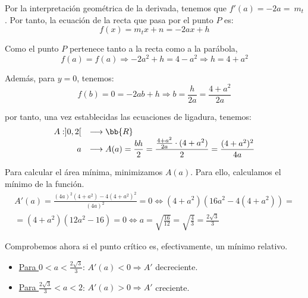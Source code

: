 \documentclass[12pt]{article}
\begin{document}
\begin{ejercicio}
\begin{enumerate}
\begin{figure}[H]
    \end{figure}

    Por la interpretación geométrica de la derivada, tenemos que $f'(a)=-2a=~m_t$. Por tanto, la ecuación de la recta que pasa por el punto $P$ es:
    \begin{equation*}
        f(x)=m_tx +n = -2ax+h
    \end{equation*}

    Como el punto $P$ pertenece tanto a la recta como a la parábola,
    \begin{equation*}
        f(a)=f(a)\Longrightarrow -2a^2+h = 4-a^2 \Longrightarrow h=4+a^2
    \end{equation*}

    Además, para $y=0$, tenemos:
    \begin{equation*}
        f(b)=0 = -2ab+h \Longrightarrow b=\frac{h}{2a} = \frac{4+a^2}{2a}
    \end{equation*}

    por tanto, una vez establecidas las ecuaciones de ligadura, tenemos:
    \begin{equation*}
        \begin{array}{rl}
            A:]0, 2[ & \longrightarrow \bb{R}\\
                    a & \longrightarrow A(a) = \displaystyle \frac{bh}{2} = \frac{\frac{4+a^2}{2a} \cdot (4+a^2)}{2} = \frac{(4+a^2)^2}{4a}
        \end{array}
    \end{equation*}

    Para calcular el área mínima, minimizamos $A(a)$. Para ello, calculamos el mínimo de la función.
    \begin{multline*}
        A'(a) = \frac{(4a)^2(4+a^2) -4(4+a^2)^2}{(4a)^2} = 0 \Longleftrightarrow
        (4+a^2)(16a^2-4(4+a^2)) =\\= (4+a^2)(12a^2-16) = 0 \Longleftrightarrow a=\sqrt{\frac{16}{12}}=\sqrt{\frac{4}{3}} = \frac{2\sqrt{3}}{3}
    \end{multline*}

    Comprobemos ahora si el punto crítico es, efectivamente, un mínimo relativo.
    \begin{itemize}
        \item \underline{Para $0<a<\frac{2\sqrt{3}}{3}$}: $A'(a)<0\Longrightarrow A'$ decreciente.
        \item \underline{Para $\frac{2\sqrt{3}}{3}<a<2$}: $A'(a)>0\Longrightarrow A'$ creciente.
    \end{itemize}


\end{enumerate}
\end{ejercicio}
\end{document}
